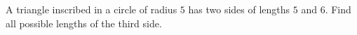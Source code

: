A triangle inscribed in a circle of radius $5$ has two sides of lengths $5$ and $6$. Find all possible lengths of the third side.
